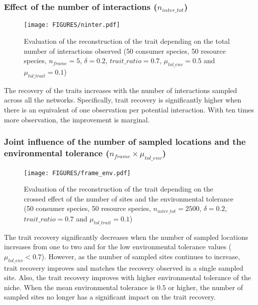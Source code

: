 \subsubsection{Effect of the number of interactions ($n_{inter\_tot}$)}

\begin{figure}[H]
    \centering
    \texttt{[image: FIGURES/ninter.pdf]}
    \caption{Evaluation of the reconstruction of the trait depending on the total number of interactions observed (50 consumer species, 50 resource species, $n_{frame} = 5$, $\delta =  0.2$, $trait\_ratio = 0.7$, $\mu_{tol\_env} = 0.5$ and $\mu_{tol\_trait} = 0.1$)}
    \label{fig:ninter}
\end{figure}

The recovery of the traits increases with the number of interactions sampled across all the networks. Specifically, trait recovery is significantly higher when there is an equivalent of one observation per potential interaction. With ten times more observation, the improvement is marginal.

\subsubsection{Joint influence of the number of sampled locations and the environmental tolerance ($n_{frame} \times \mu_{tol\_env}$)}

\begin{figure}[H]
    \centering
    \texttt{[image: FIGURES/frame\_env.pdf]}
    \caption{Evaluation of the reconstruction of the trait depending on the crossed effect of the number of sites and the environmental tolerance (50 consumer species, 50 resource species, $n_{inter\_tot} = 2500$, $\delta =  0.2$, $trait\_ratio = 0.7$ and $\mu_{tol\_trait} = 0.1$)}
    \label{fig:frame_env}
\end{figure}

The trait recovery significantly decreases when the number of sampled locations increases from one to two and for the low environmental tolerance values ($\mu_{tol\_env} < 0.7$). However, as the number of sampled sites continues to increase, trait recovery improves and matches the recovery observed in a single sampled site. Also, the trait recovery improves with higher environmental tolerance of the niche. When the mean environmental tolerance is $0.5$ or higher, the number of sampled sites no longer has a significant impact on the trait recovery.



